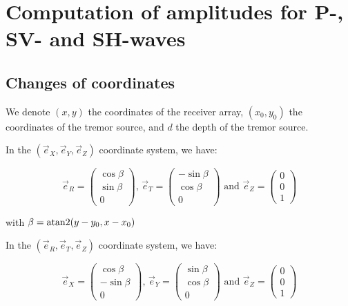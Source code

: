 \documentclass[methods.tex]{subfiles}
\begin{document}
\section{Computation of amplitudes for P-, SV- and SH-waves}

\subsection{Changes of coordinates}

We denote $(x, y)$ the coordinates of the receiver array, $(x_0, y_0)$ the coordinates of the tremor source, and $d$ the depth of the tremor source.

In the $(\vec{e}_X, \vec{e}_Y, \vec{e}_Z)$ coordinate system, we have:

\begin{equation}
\vec{e}_R = \begin{pmatrix}
\cos \beta \\
\sin \beta \\
0
\end{pmatrix} \text{, } \vec{e}_T = \begin{pmatrix}
- \sin \beta \\
\cos \beta \\
0
\end{pmatrix} \text{ and } \vec{e}_Z = \begin{pmatrix}
0 \\
0 \\
1
\end{pmatrix}
\end{equation}

with $\beta = \operatorname{atan2} (y - y_0 , x - x_0)$

In the $(\vec{e}_R, \vec{e}_T, \vec{e}_Z)$ coordinate system, we have:

\begin{equation}
\vec{e}_X = \begin{pmatrix}
\cos \beta \\
- \sin \beta \\
0
\end{pmatrix} \text{, } \vec{e}_Y = \begin{pmatrix}
\sin \beta \\
\cos \beta \\
0
\end{pmatrix} \text{ and } \vec{e}_Z = \begin{pmatrix}
0 \\
0 \\
1
\end{pmatrix}
\end{equation}
\end{document}

